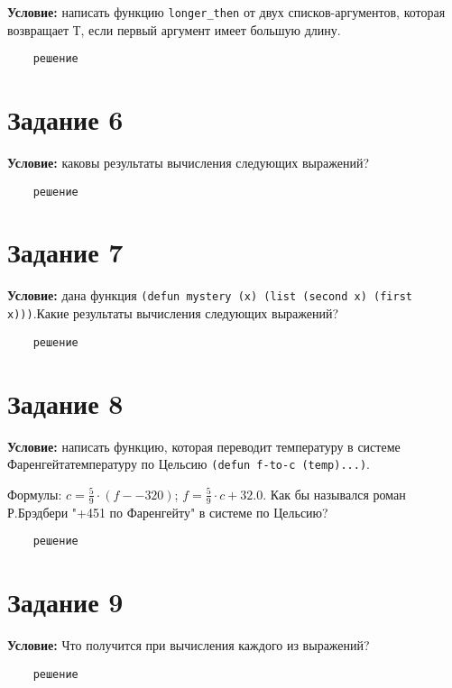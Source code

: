 \textbf{Условие:} написать функцию \texttt{longer\_then} от двух списков-аргументов, которая возвращает Т, если первый аргумент имеет большую длину.

\begin{lstlisting}
	решение
\end{lstlisting}


\section{Задание 6}

\textbf{Условие:} каковы результаты вычисления следующих выражений?

\begin{lstlisting}
	решение
\end{lstlisting}


\section{Задание 7}

\textbf{Условие:} дана функция \texttt{(defun mystery (x) (list (second x) (first x)))}.Какие результаты вычисления следующих выражений? 

\begin{lstlisting}
	решение
\end{lstlisting}


\section{Задание 8}

\textbf{Условие:} написать функцию, которая переводит температуру в системе Фаренгейтатемпературу по Цельсию \texttt{(defun f-to-c (temp)...)}. 

Формулы: $c = \frac{5}{9} \cdot (f -- 320)$; $f= \frac{5}{9} \cdot c + 32.0$. Как бы назывался роман Р.Брэдбери "+451 по Фаренгейту" в системе по Цельсию?

\begin{lstlisting}
	решение
\end{lstlisting}


\section{Задание 9}

\textbf{Условие:} Что получится при вычисления каждого из выражений?

\begin{lstlisting}
	решение
\end{lstlisting}


